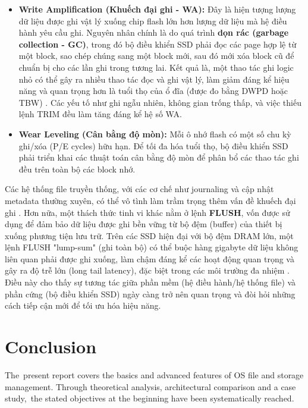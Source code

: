 \documentclass[12pt]{article}
\begin{document}
\begin{itemize}
    \item \textbf{Write Amplification (Khuếch đại ghi - WA):} Đây là hiện tượng lượng dữ liệu được ghi vật lý xuống chip flash lớn hơn lượng dữ liệu mà hệ điều hành yêu cầu ghi. Nguyên nhân chính là do quá trình \textbf{dọn rác (garbage collection - GC)}, trong đó bộ điều khiển SSD phải đọc các page hợp lệ từ một block, sao chép chúng sang một block mới, sau đó mới xóa block cũ để chuẩn bị cho các lần ghi trong tương lai. Kết quả là, một thao tác ghi logic nhỏ có thể gây ra nhiều thao tác đọc và ghi vật lý, làm giảm đáng kể hiệu năng và quan trọng hơn là tuổi thọ của ổ đĩa (được đo bằng DWPD hoặc TBW) \parencite{Viking2017AN0035}. Các yếu tố như ghi ngẫu nhiên, không gian trống thấp, và việc thiếu lệnh TRIM đều làm tăng đáng kể hệ số WA.
    \item \textbf{Wear Leveling (Cân bằng độ mòn):} Mỗi ô nhớ flash có một số chu kỳ ghi/xóa (P/E cycles) hữu hạn. Để tối đa hóa tuổi thọ, bộ điều khiển SSD phải triển khai các thuật toán cân bằng độ mòn để phân bổ các thao tác ghi đều trên toàn bộ các block nhớ.
\end{itemize}

Các hệ thống file truyền thống, với các cơ chế như journaling và cập nhật metadata thường xuyên, có thể vô tình làm trầm trọng thêm vấn đề khuếch đại ghi \parencite{Lu2013Extending}. Hơn nữa, một thách thức tinh vi khác nằm ở lệnh \textbf{FLUSH}, vốn được sử dụng để đảm bảo dữ liệu được ghi bền vững từ bộ đệm (buffer) của thiết bị xuống phương tiện lưu trữ. Trên các SSD hiện đại với bộ đệm DRAM lớn, một lệnh FLUSH "lump-sum" (ghi toàn bộ) có thể buộc hàng gigabyte dữ liệu không liên quan phải được ghi xuống, làm chậm đáng kể các hoạt động quan trọng và gây ra độ trễ lớn (long tail latency), đặc biệt trong các môi trường đa nhiệm \parencite{Yeon2018RFLUSH}. Điều này cho thấy sự tương tác giữa phần mềm (hệ điều hành/hệ thống file) và phần cứng (bộ điều khiển SSD) ngày càng trở nên quan trọng và đòi hỏi những cách tiếp cận mới để tối ưu hóa hiệu năng.


\section{Conclusion}
The present report covers the basics and advanced features of OS file and storage management. Through theoretical analysis, architectural comparison and a case study, the stated objectives at the beginning have been systematically reached. 
\end{document}
